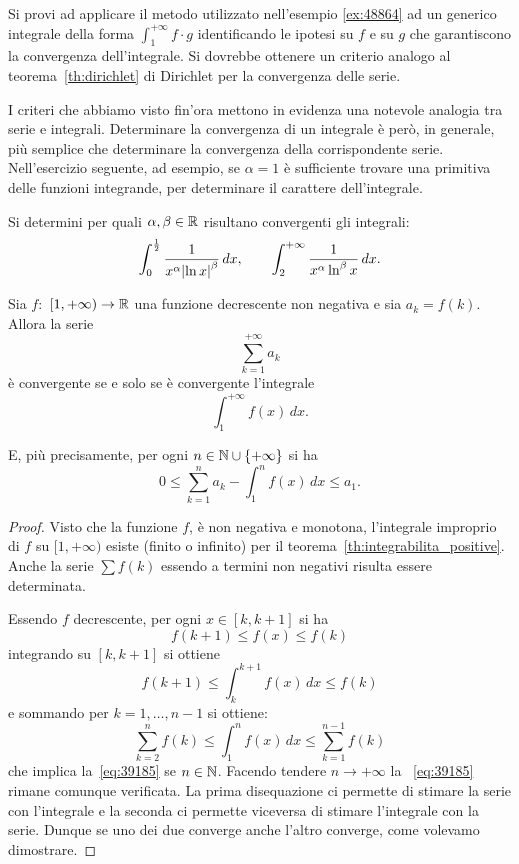 \begin{exercise}
  Si provi ad applicare il metodo utilizzato nell'esempio \ref{ex:48864} ad 
  un generico integrale della forma $\int_1^{+\infty} f\cdot g$ identificando le ipotesi 
  su $f$ e su $g$ che garantiscono la convergenza dell'integrale.
  Si dovrebbe ottenere un criterio analogo al teorema~\ref{th:dirichlet} di Dirichlet
  per la convergenza delle serie.
\end{exercise}


I criteri che abbiamo visto fin'ora mettono in evidenza una notevole
analogia tra serie e integrali. Determinare la convergenza
di un integrale è però, in generale, più semplice che determinare
la convergenza della corrispondente serie.
Nell'esercizio seguente, ad esempio, se $\alpha=1$ è sufficiente trovare una primitiva
delle funzioni integrande, per determinare il carattere dell'integrale.

\begin{exercise}
Si determini per quali $\alpha,\beta\in {\mathbb R}$ risultano convergenti
gli integrali:
\[
  \int_0^{\frac 1 2} \frac{1}{x^\alpha {\left|\ln x\right|}^\beta}\, dx,
  \qquad
  \int_2^{+\infty} \frac{1}{x^\alpha \ln^\beta x} \, dx.
\]
\end{exercise}

\begin{theorem}
\mymark{**}
Sia $f\colon$ $[1,+\infty)\to {\mathbb R}$ una funzione decrescente non negativa
e sia $a_k=f(k)$.
Allora la serie
\[
   \sum_{k=1}^{+\infty} a_k
\]
è convergente se e solo se è convergente l'integrale
\[
  \int_1^{+\infty} f(x)\, dx.
\]

E, più precisamente, per ogni $n\in {\mathbb N}\cup{\left\{ +\infty \right\}}$ si ha
\begin{equation}\label{eq:39185}
  0
  \le \sum_{k=1}^{n} a_k - \int_1^{n}f(x)\, dx
  \le a_1.
\end{equation}

\end{theorem}
%
\begin{proof}
\mymark{**}
Visto che la funzione $f$, è non negativa e monotona,
l'integrale improprio di $f$ su $[1,+\infty)$ esiste (finito o infinito)
per il teorema~\ref{th:integrabilita_positive}.
Anche la serie $\sum f(k)$ essendo a termini non negativi risulta essere determinata.

Essendo $f$ decrescente, per ogni $x \in [k,k+1]$ si ha
\[
  f(k+1) \le f(x) \le f(k)
\]
integrando su $[k,k+1]$ si ottiene
\[
  f(k+1) \le \int_{k}^{k+1} f(x)\, dx \le f(k)
\]
e sommando per $k=1,\dots, n-1$ si ottiene:
\[
  \sum_{k=2}^{n} f(k) \le \int_{1}^{n} f(x)\, dx \le \sum_{k=1}^{n-1} f(k)
\]
che implica la~\eqref{eq:39185} se $n\in {\mathbb N}$. Facendo
tendere $n\to+\infty$ la ~\eqref{eq:39185} rimane comunque verificata.
La prima disequazione ci permette di stimare la serie con l'integrale
e la seconda ci permette viceversa di stimare l'integrale con la serie.
Dunque se uno dei due converge anche l'altro converge, come volevamo dimostrare.
\end{proof}

